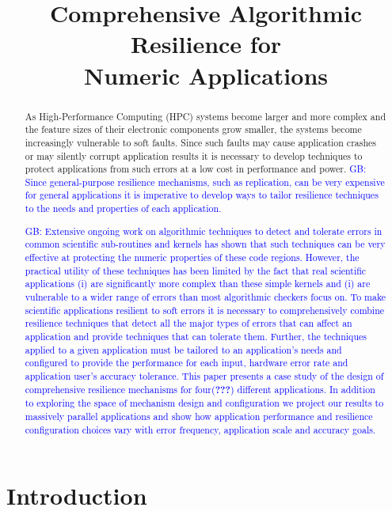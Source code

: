 \documentclass{sig-alternate}
\title{Comprehensive Algorithmic Resilience for \\Numeric Applications}
\newcommand{\greg}[1]{%
  \textcolor{blue}{GB: #1}
}
\begin{document}
\maketitle

\begin{abstract}
As High-Performance Computing (HPC) systems become larger and more complex and the feature sizes of their electronic components grow smaller, the systems become increasingly vulnerable to soft faults.
Since such faults may cause application crashes or may silently corrupt application results it is necessary to develop techniques to protect applications from such errors at a low cost in performance and power.
\greg{Since general-purpose resilience mechanisms, such as replication, can be very expensive for general applications it is imperative to develop ways to tailor resilience techniques to the needs and properties of each application.}

\greg{Extensive ongoing work on algorithmic techniques to detect and tolerate errors in common scientific sub-routines and kernels has shown that such techniques can be very effective at protecting the numeric properties of these code regions.
However, the practical utility of these techniques has been limited by the fact that real scientific applications (i) are significantly more complex than these simple kernels and (i) are vulnerable to a wider range of errors than most algorithmic checkers focus on.
To make scientific applications resilient to soft errors it is necessary to comprehensively combine resilience techniques that detect all the major types of errors that can affect an application and provide techniques that can tolerate them.
Further, the techniques applied to a given application must be tailored to an application's needs and configured to provide the performance for each input, hardware error rate and application user's accuracy tolerance.
This paper presents a case study of the design of comprehensive resilience mechanisms for four(\textbf{???}) different applications.
In addition to exploring the space of mechanism design and configuration we project our results to massively parallel applications and show how application performance and resilience configuration choices vary with error frequency, application scale and accuracy goals.
}

\end{abstract}

\section{Introduction}
\label{sec:intro}
\end{document}

